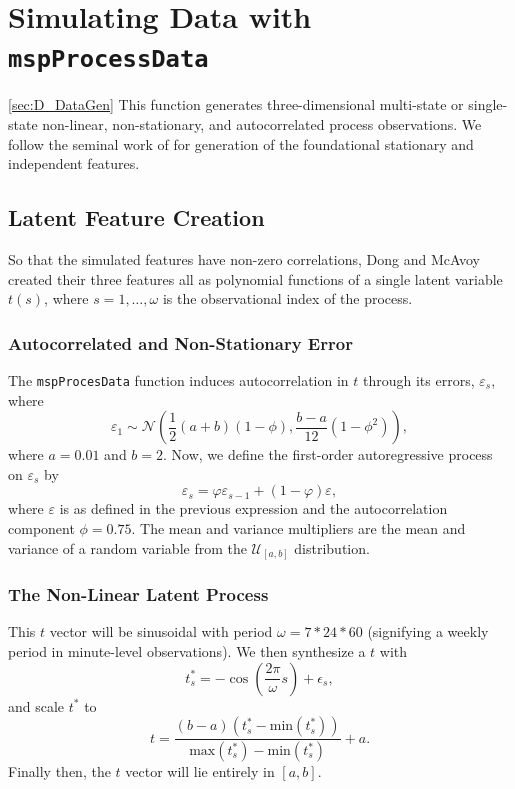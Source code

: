 \documentclass{report}\usepackage[]{graphicx}\usepackage[]{color}
\begin{document}

\section{Simulating Data with \texttt{mspProcessData}} \ref{sec:D_DataGen}
This function generates three-dimensional multi-state or single-state non-linear, non-stationary, and autocorrelated process observations. We follow the seminal work of \cite{dong_batch_1996} for generation of the foundational stationary and independent features.


\subsection{Latent Feature Creation}
So that the simulated features have non-zero correlations, Dong and McAvoy created their three features all as polynomial functions of a single latent variable $t(s)$, where $s = 1, \ldots, \omega$ is the observational index of the process.

\subsubsection{Autocorrelated and Non-Stationary Error}
The \texttt{mspProcesData} function induces autocorrelation in $t$ through its errors, $\varepsilon_s$, where
\[
  \varepsilon_1 \sim \mathcal{N}\left(\frac{1}{2}(a + b)(1 - \phi), \frac{b - a}{12} (1 - \phi ^ 2)\right),
\]
where $a = 0.01$ and $b = 2$. Now, we define the first-order autoregressive process on $\varepsilon_s$ by
\[
  \varepsilon_s = \varphi\varepsilon_{s - 1} + (1 - \varphi)\varepsilon,
\]
where $\varepsilon$ is as defined in the previous expression and the autocorrelation component $\phi = 0.75$. The mean and variance multipliers are the mean and variance of a random variable from the $\mathcal{U}_{[a,b]}$ distribution.

\subsubsection{The Non-Linear Latent Process}
This $t$ vector will be sinusoidal with period $\omega = 7 * 24 * 60$ (signifying a weekly period in  minute-level observations). We then synthesize a $t$ with
\[
  t^*_s = -\cos\left( \frac{2\pi}{\omega} s \right) + \epsilon_s,
\]
and scale $t^*$ to
\[
  t = \frac{(b - a)(t^*_s - \text{min}(t^*_s))}{\text{max}(t^*_s) - \text{min}(t^*_s)} + a.
\]
Finally then, the $t$ vector will lie entirely in $[a,b]$.
\end{document}
